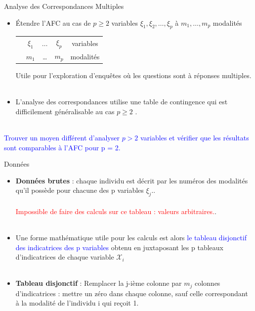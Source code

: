 \documentclass[10pt]{beamer}
\begin{document}
\begin{frame}{ Analyse des Correspondances Multiples }
\begin{itemize}
\item Étendre l'AFC au cas de $p \geq 2$ variables  $\xi_1, \xi_2,  \ldots, \xi_p$ à   $ m_1, \ldots, m_p $ modalités\\

\begin{table}
\begin{tabular}{ccccc}

 & $\xi_1$& $\ldots$ & $ \xi_p$& variables \\
 & $m_1$ & \ldots  &$m_p$ & modalités 
 
\end{tabular} 
\end{table}

 Utile pour l'exploration d'enquêtes où les questions sont à réponses multiples.\\~\\
\item L’analyse des correspondances utilise une table
de contingence qui est difficilement généralisable au cas
$p \geq 2$ .\\~\\
\end{itemize}

\textcolor{blue}{Trouver un moyen différent d'analyser $p > 2$
variables et vérifier que les résultats sont comparables à l’AFC pour p = 2.}
 

\end{frame}



\begin{frame}{ Données}
 
 \begin{itemize}
 \item \textbf{Données brutes} :  chaque individu est décrit par les numéros
des modalités qu’il possède pour chacune des p variables $\xi_j$..\\~\\

\textcolor{red}{Impossible de faire des calculs sur ce tableau :  valeurs arbitraires.}.\\~\\


\item Une forme mathématique utile pour les calculs est alors \textcolor{blue}{le tableau disjonctif des indicatrices des p variables} obtenu en juxtaposant les p tableaux d'indicatrices de chaque variable $\mathcal{X}_i$\\~\\

 \item  \textbf{Tableau disjonctif } : Remplacer la j-ième colonne par $m_j$ colonnes d'indicatrices : mettre  un zéro dans chaque colonne, sauf celle correspondant à la modalité de l’individu i qui
reçoit 1.
 \end{itemize}

 


\end{frame}
\end{document}
